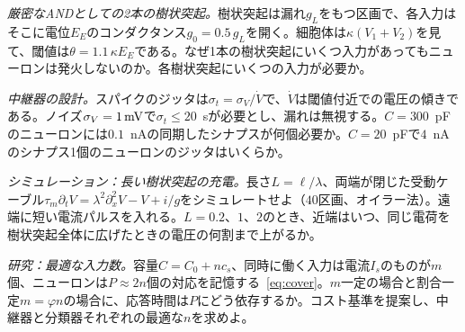 \begin{exercise}[\lvlB]
\label{ex:19:4}
\emph{厳密なANDとしての2本の樹状突起。}樹状突起は漏れ$g_L$をもつ区画で、各入力はそこに電位$E_E$のコンダクタンス$g_0=0.5\,g_L$を開く。細胞体は$\kappa(V_1+V_2)$を見て、閾値は$\theta=1.1\,\kappa E_E$である。なぜ1本の樹状突起にいくつ入力があってもニューロンは発火しないのか。各樹状突起にいくつの入力が必要か。
\end{exercise}

\begin{exercise}[\lvlB]
\label{ex:19:5}
\emph{中継器の設計。}スパイクのジッタは$\sigma_t=\sigma_V/\dot V$で、$\dot V$は閾値付近での電圧の傾きである。ノイズ$\sigma_V=1\,\text{mV}$で$\sigma_t\le20$~\textmu sが必要とし、漏れは無視する。$C=300$~pFのニューロンには$0.1$~nAの同期したシナプスが何個必要か。$C=20$~pFで$4$~nAのシナプス1個のニューロンのジッタはいくらか。
\end{exercise}

\begin{exercise}[\lvlB]
\label{ex:19:6}
\emph{シミュレーション：長い樹状突起の充電。}長さ$L=\ell/\lambda$、両端が閉じた受動ケーブル$\tau_m\partial_tV=\lambda^2\partial_x^2V-V+i/g$をシミュレートせよ（$40$区画、オイラー法）。遠端に短い電流パルスを入れる。$L=0.2$、$1$、$2$のとき、近端はいつ、同じ電荷を樹状突起全体に広げたときの電圧の何割まで上がるか。
\end{exercise}

\begin{exercise}[\lvlC]
\label{ex:19:7}
\emph{研究：最適な入力数。}容量$C=C_0+nc_s$、同時に働く入力は電流$I_s$のものが$m$個、ニューロンは$P\approx2n$個の対応を記憶する~\eqref{eq:cover}。$m$一定の場合と割合一定$m=\varphi n$の場合に、応答時間は$P$にどう依存するか。コスト基準を提案し、中継器と分類器それぞれの最適な$n$を求めよ。
\end{exercise}

